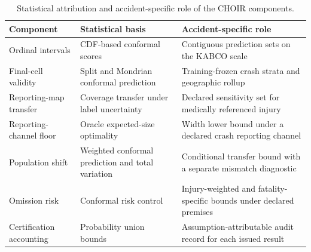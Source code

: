 \begin{table}[pos=htbp]
\centering
\caption{Statistical attribution and accident-specific role of the CHOIR components.}
\label{tbl:attribution}
\begin{tabular}{p{.20\linewidth}p{.31\linewidth}p{.39\linewidth}}
\toprule
Component & Statistical basis & Accident-specific role \\
\midrule
Ordinal intervals & CDF-based conformal scores & Contiguous prediction sets on the KABCO scale \\
Final-cell validity & Split and Mondrian conformal prediction & Training-frozen crash strata and geographic rollup \\
Reporting-map transfer & Coverage transfer under label uncertainty & Declared sensitivity set for medically referenced injury \\
Reporting-channel floor & Oracle expected-size optimality & Width lower bound under a declared crash reporting channel \\
Population shift & Weighted conformal prediction and total variation & Conditional transfer bound with a separate mismatch diagnostic \\
Omission risk & Conformal risk control & Injury-weighted and fatality-specific bounds under declared premises \\
Certification accounting & Probability union bounds & Assumption-attributable audit record for each issued result \\
\bottomrule
\end{tabular}
\end{table}
